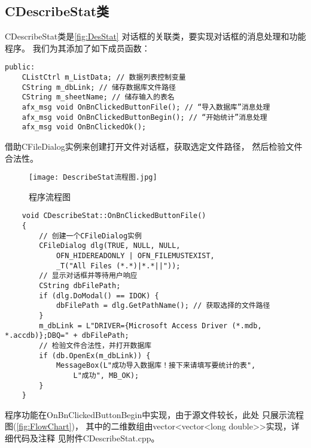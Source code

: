 \subsection{CDescribeStat类}
CDescribeStat类是\autoref{fig:DesStat}
对话框的关联类，要实现对话框的消息处理和功能程序。
我们为其添加了如下成员函数：
\begin{lstlisting}
public:
	CListCtrl m_ListData; // 数据列表控制变量
	CString m_dbLink; // 储存数据库文件路径
	CString m_sheetName; // 储存输入的表名
	afx_msg void OnBnClickedButtonFile(); // “导入数据库”消息处理
	afx_msg void OnBnClickedButtonBegin(); // “开始统计”消息处理
	afx_msg void OnBnClickedOk(); 
\end{lstlisting}

借助CFileDialog实例来创建打开文件对话框，获取选定文件路径，
然后检验文件合法性。

\begin{figure}[!htbp]
    \centering
    \texttt{[image: DescribeStat流程图.jpg]}
    \caption{程序流程图}
    \label{fig:FlowChart}
\end{figure}

\begin{lstlisting}
    void CDescribeStat::OnBnClickedButtonFile()
    {
        // 创建一个CFileDialog实例
        CFileDialog dlg(TRUE, NULL, NULL, 
            OFN_HIDEREADONLY | OFN_FILEMUSTEXIST, 
            _T("All Files (*.*)|*.*||"));
        // 显示对话框并等待用户响应
        CString dbFilePath;
        if (dlg.DoModal() == IDOK) {
            dbFilePath = dlg.GetPathName(); // 获取选择的文件路径
        }
        m_dbLink = L"DRIVER={Microsoft Access Driver (*.mdb, *.accdb)};DBQ=" + dbFilePath;
        // 检验文件合法性，并打开数据库
        if (db.OpenEx(m_dbLink)) {
            MessageBox(L"成功导入数据库！接下来请填写要统计的表", 
                L"成功", MB_OK);
        }
    }  
\end{lstlisting}
程序功能在OnBnClickedButtonBegin中实现，由于源文件较长，此处
只展示流程图(\autoref{fig:FlowChart})，
其中的二维数组由vector<vector<long double>>实现，详细代码及注释
见附件CDescribeStat.cpp。





